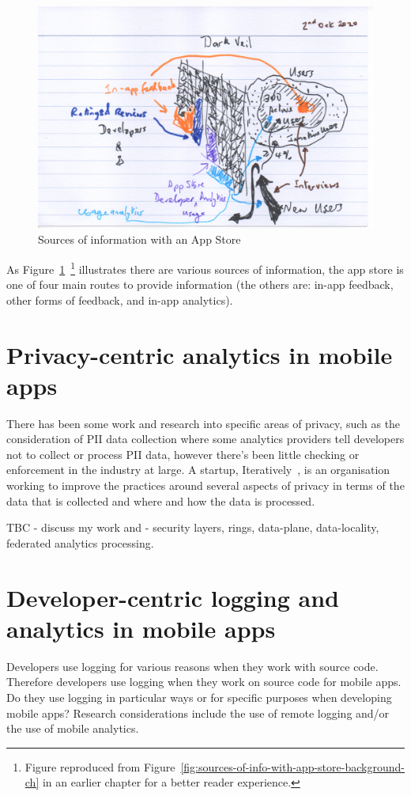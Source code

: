 \begin{figure}[htbp!]
    \centering
    \includegraphics[width=13cm]{images/rough-sketches/sources-of-information-with-app-store-1.png}
    \caption{Sources of information with an App Store}
    \label{fig:sources-of-info-with-app-store-future-work-ch}
\end{figure}

As Figure~\ref{fig:sources-of-info-with-app-store-future-work-ch}~\footnote{Figure reproduced from Figure~\ref{fig:sources-of-info-with-app-store-background-ch} in an earlier chapter for a better reader experience.} illustrates there are various sources of information, the app store is one of four main routes to provide information (the others are: in-app feedback, other forms of feedback, and in-app analytics).

\section{Privacy-centric analytics in mobile apps}
There has been some work and research into specific areas of privacy, such as the consideration of PII data collection where some analytics providers tell developers not to collect or process PII data, however there's been little checking or enforcement in the industry at large. A startup, Iteratively~\cite{iteratively_homepage}, is an organisation working to improve the practices around several aspects of privacy in terms of the data that is collected and where and how the data is processed.

TBC - discuss my work and - security layers, rings, data-plane, data-locality, federated analytics processing.

\section{Developer-centric logging and analytics in mobile apps}
Developers use logging for various reasons when they work with source code. Therefore developers use logging when they work on source code for mobile apps. Do they use logging in particular ways or for specific purposes when developing mobile apps? Research considerations include the use of remote logging and/or the use of mobile analytics.

